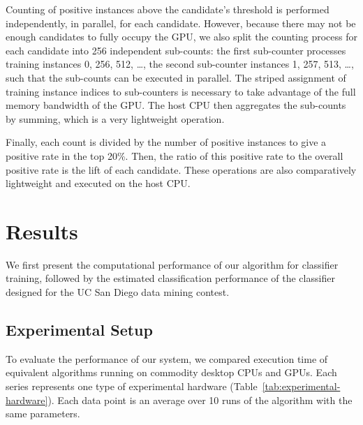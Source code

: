 \documentclass[11pt]{article}       %
\begin{document}
Counting of positive instances above the candidate's threshold is performed independently, in parallel, for each candidate. However, because there may not be enough candidates to fully occupy the GPU, we also split the counting process for each candidate into 256 independent sub-counts: the first sub-counter processes training instances 0, 256, 512, \ldots, the second sub-counter instances 1, 257, 513, \ldots, such that the sub-counts can be executed in parallel. The striped assignment of training instance indices to sub-counters is necessary to take advantage of the full memory bandwidth of the GPU. The host CPU then aggregates the sub-counts by summing, which is a very lightweight operation.

Finally, each count is divided by the number of positive instances to give a positive rate in the top 20\%. Then, the ratio of this positive rate to the overall positive rate is the lift of each candidate. These operations are also comparatively lightweight and executed on the host CPU.

\section{Results} \label{results}
We first present the computational performance of our algorithm for classifier training, followed by the estimated classification performance of the classifier designed for the UC San Diego data mining contest.

\subsection{Experimental Setup} \label{experiment}
To evaluate the performance of our system, we compared execution time of equivalent algorithms running on commodity desktop CPUs and GPUs. Each series represents one type of experimental hardware (Table~\ref{tab:experimental-hardware}). Each data point is an average over 10 runs of the algorithm with the same parameters.
\end{document}
